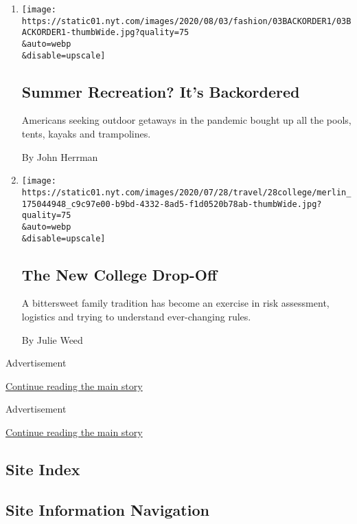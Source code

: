 \begin{enumerate}
\def\labelenumi{\arabic{enumi}.}
\item
  \href{/2020/08/04/style/outdoor-camping-gear-pools-backordered.html}{}

  \texttt{[image: https://static01.nyt.com/images/2020/08/03/fashion/03BACKORDER1/03BACKORDER1-thumbWide.jpg?quality=75\\\&auto=webp\\\&disable=upscale]}

  \hypertarget{summer-recreation-its-backordered}{%
  \subsection{Summer Recreation? It's
  Backordered}\label{summer-recreation-its-backordered}}

  Americans seeking outdoor getaways in the pandemic bought up all the
  pools, tents, kayaks and trampolines.

  By John Herrman
\item
  \href{/2020/07/29/travel/virus-college-travel-restrictions.html}{}

  \texttt{[image: https://static01.nyt.com/images/2020/07/28/travel/28college/merlin\_175044948\_c9c97e00-b9bd-4332-8ad5-f1d0520b78ab-thumbWide.jpg?quality=75\\\&auto=webp\\\&disable=upscale]}

  \hypertarget{the-new-college-drop-off}{%
  \subsection{The New College Drop-Off}\label{the-new-college-drop-off}}

  A bittersweet family tradition has become an exercise in risk
  assessment, logistics and trying to understand ever-changing rules.

  By Julie Weed
\end{enumerate}

Advertisement

\protect\hyperlink{after-mid2}{Continue reading the main story}

Advertisement

\protect\hyperlink{after-mktg}{Continue reading the main story}

\hypertarget{site-index}{%
\subsection{Site Index}\label{site-index}}

\hypertarget{site-information-navigation}{%
\subsection{Site Information
Navigation}\label{site-information-navigation}}

